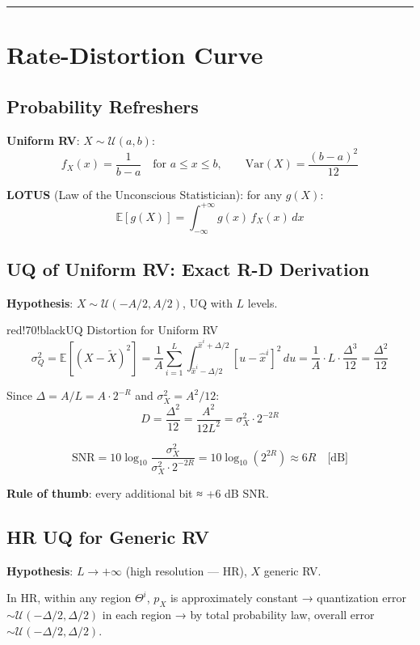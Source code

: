 \bigskip\hrule\bigskip

\section{Rate-Distortion Curve}

\subsection{Probability Refreshers}

\textbf{Uniform RV}: $X \sim \mathcal{U}(a,b)$:
\[
f_X(x) = \frac{1}{b-a} \quad \text{for } a\leq x\leq b, \qquad \text{Var}(X) = \frac{(b-a)^2}{12}
\]

\textbf{LOTUS} (Law of the Unconscious Statistician): for any $g(X)$:
\[
\mathbb{E}[g(X)] = \int_{-\infty}^{+\infty} g(x)\, f_X(x)\, dx
\]

\subsection{UQ of Uniform RV: Exact R-D Derivation}

\textbf{Hypothesis}: $X \sim \mathcal{U}(-A/2, A/2)$, UQ with $L$ levels.

\begin{calloutbox}{red!70!black}{UQ Distortion for Uniform RV}
\[
\sigma_Q^2 = \mathbb{E}[(X-\tilde{X})^2] = \frac{1}{A}\sum_{i=1}^L \int_{\hat{x}^i-\Delta/2}^{\hat{x}^i+\Delta/2}[u-\hat{x}^i]^2\,du = \frac{1}{A}\cdot L \cdot\frac{\Delta^3}{12} = \frac{\Delta^2}{12}
\]

Since $\Delta = A/L = A\cdot 2^{-R}$ and $\sigma_X^2 = A^2/12$:
\[
D = \frac{\Delta^2}{12} = \frac{A^2}{12 L^2} = \sigma_X^2 \cdot 2^{-2R}
\]

\[
\mathrm{SNR} = 10\log_{10}\frac{\sigma_X^2}{\sigma_X^2 \cdot 2^{-2R}} = 10\log_{10}(2^{2R}) \approx 6R \quad \text{[dB]}
\]

\textbf{Rule of thumb}: every additional bit ≈ +6 dB SNR.
\end{calloutbox}

\subsection{HR UQ for Generic RV}

\textbf{Hypothesis}: $L \to +\infty$ (high resolution — HR), $X$ generic RV.

In HR, within any region $\Theta^i$, $p_X$ is approximately constant → quantization error $\sim \mathcal{U}(-\Delta/2, \Delta/2)$ in each region → by total probability law, overall error $\sim \mathcal{U}(-\Delta/2, \Delta/2)$.

